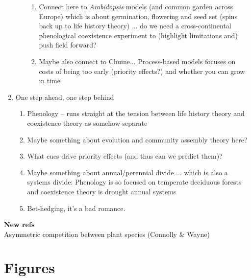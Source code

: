 \documentclass[11pt,letter]{article}
\begin{document}
\begin{enumerate}
\begin{enumerate}
\begin{enumerate}
\item Connect here to \emph{Arabidopsis} models (and common garden across Europe) which is about germination, flowering and seed set (spins back up to life history theory) ... do we need a cross-continental phenological coexistence experiment to (highlight limitations and) push field forward? 
\item Maybe also connect to Chuine... Process-based models focuses on costs of being too early (priority effects?) and whether you can grow in time
\end{enumerate}
\end{enumerate}
\item One step ahead, one step behind %
\begin{enumerate}
\item Phenology -- runs straight at the tension between life history theory and coexistence theory as somehow separate %
\item Maybe something about evolution and community assembly theory here? %
\item What cues drive priority effects (and thus can we predict them)?
\item Maybe something about annual/perennial divide ... which is also a systems divide: Phenology is so focused on temperate deciduous forests and coexistence theory is drought annual systems 
\item Bet-hedging, it's a bad romance. 
\end{enumerate}
\end{enumerate}

{\bf New refs}\\
Asymmetric competition between plant species (Connolly \& Wayne) %

\section{Figures}
\end{document}
